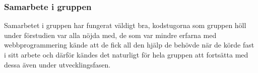 \subsubsection{Samarbete i gruppen}
Samarbetet i gruppen har fungerat väldigt bra, kodstugorna som gruppen höll under förstudien var alla nöjda med, de som var mindre erfarna med webbprogrammering kände att de fick all den hjälp de behövde när de körde fast i sitt arbete och därför kändes det naturligt för hela gruppen att fortsätta med dessa även under utvecklingsfasen.

